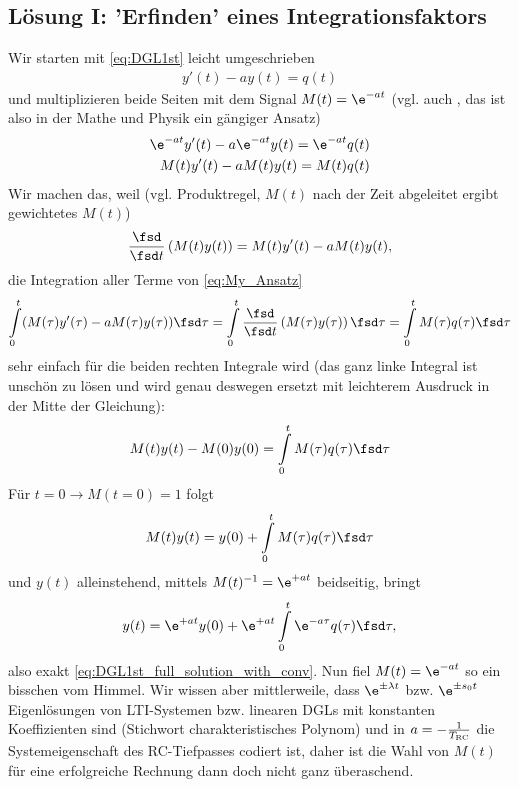 \subsection*{Lösung I: 'Erfinden' eines Integrationsfaktors}

Wir starten mit \eqref{eq:DGL1st} leicht umgeschrieben
\begin{align}
y'(t) - a y(t) = q(t)
\end{align}
und multiplizieren beide Seiten mit dem Signal $M(t) = \e^{-a t}$ (vgl. auch \cite[Kap. 7.2, S. 336]{Arfken2013}, das ist also in der Mathe und Physik ein gängiger Ansatz)
\begin{align}
\e^{-a t} y'(t) - a \e^{-a t} y(t) = \e^{-a t} q(t)\\
M(t) y'(t) - a M(t) y(t) = M(t) q(t)
\label{eq:My_Ansatz}
\end{align}
Wir machen das, weil (vgl. Produktregel, $M(t)$ nach der Zeit abgeleitet ergibt gewichtetes $M(t)$)
\begin{align}
\frac{\fsd}{\fsd t}\left(M(t) y(t)\right) = M(t) y'(t) - a M(t) y(t),
\end{align}
die Integration aller Terme von \eqref{eq:My_Ansatz}
\begin{align}
\int\limits_{0}^{t} (M(\tau) y'(\tau) - a M(\tau) y(\tau)) \fsd \tau =
\int\limits_{0}^{t} \frac{\fsd}{\fsd t}\left(M(\tau) y(\tau)\right) \fsd \tau = \int\limits_{0}^{t} M(\tau) q(\tau) \fsd\tau
\end{align}
sehr einfach für die beiden rechten Integrale wird (das ganz linke Integral ist unschön zu lösen und wird genau deswegen ersetzt mit leichterem Ausdruck in der Mitte der Gleichung):
\begin{align}
M(t) y(t) - M(0)y(0) = \int\limits_{0}^{t} M(\tau) q(\tau) \fsd\tau
\end{align}
Für $t=0 \rightarrow M(t=0)=1$ folgt
\begin{align}
M(t) y(t) = y(0) + \int\limits_{0}^{t} M(\tau) q(\tau) \fsd\tau
\end{align}
und $y(t)$ alleinstehend, mittels $M(t)^{-1} = \e^{+a t}$ beidseitig, bringt
\begin{align}
y(t) = \e^{+a t} y(0) + \e^{+a t} \int\limits_{0}^{t} \e^{-a \tau} q(\tau) \fsd\tau,
\end{align}
also exakt \eqref{eq:DGL1st_full_solution_with_conv}. Nun fiel $M(t) = \e^{-a t}$ so ein bisschen vom Himmel. Wir wissen aber mittlerweile, dass $\e^{\pm \lambda t}$
bzw. $\e^{\pm s_0 t}$ Eigenlösungen von LTI-Systemen bzw. linearen DGLs mit konstanten Koeffizienten sind (Stichwort charakteristisches Polynom) und in $a=-\frac{1}{T_\text{RC}}$ die Systemeigenschaft des RC-Tiefpasses codiert ist, daher ist die Wahl von $M(t)$ für eine erfolgreiche Rechnung dann doch nicht ganz überaschend.

